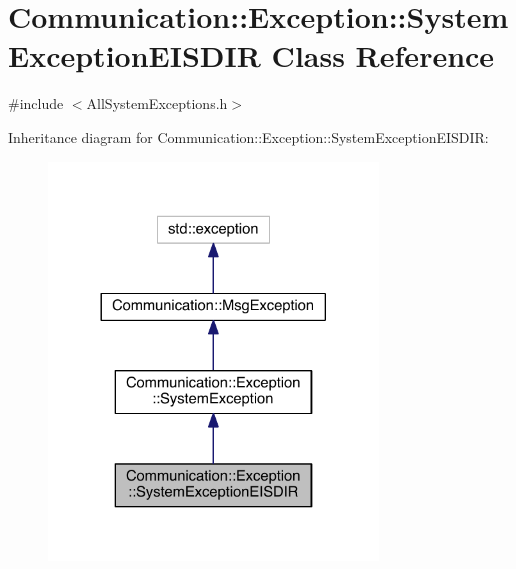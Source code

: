 \hypertarget{class_communication_1_1_exception_1_1_system_exception_e_i_s_d_i_r}{}\section{Communication\+:\+:Exception\+:\+:System\+Exception\+E\+I\+S\+D\+I\+R Class Reference}
\label{class_communication_1_1_exception_1_1_system_exception_e_i_s_d_i_r}


{\ttfamily \#include $<$All\+System\+Exceptions.\+h$>$}



Inheritance diagram for Communication\+:\+:Exception\+:\+:System\+Exception\+E\+I\+S\+D\+I\+R\+:\nopagebreak
\begin{figure}[H]
\begin{center}
\leavevmode
\includegraphics[width=248pt]{class_communication_1_1_exception_1_1_system_exception_e_i_s_d_i_r__inherit__graph}
\end{center}
\end{figure}


